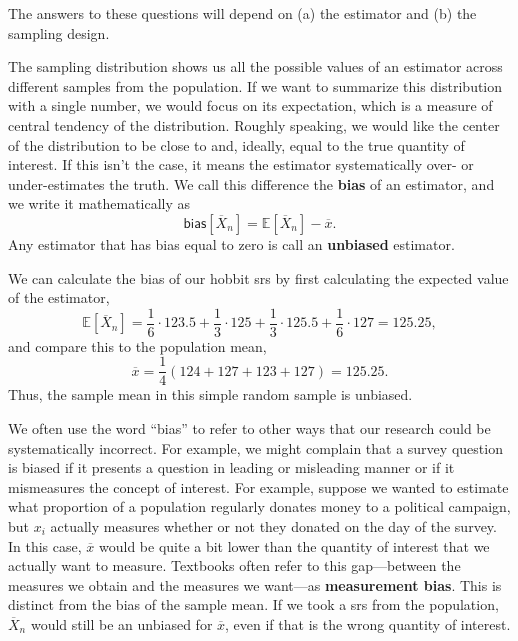 \documentclass[
  letterpaper,
  DIV=11,
  numbers=noendperiod]{scrreprt}
\newcommand{\E}{\mathbb{E}}
\newcommand{\Xbar}{\overline{X}}
\theoremstyle{definition}
\theoremstyle{definition}
\theoremstyle{plain}
\theoremstyle{remark}
\begin{document}
The answers to these questions will depend on (a) the estimator and (b)
the sampling design.

The sampling distribution shows us all the possible values of an
estimator across different samples from the population. If we want to
summarize this distribution with a single number, we would focus on its
expectation, which is a measure of central tendency of the distribution.
Roughly speaking, we would like the center of the distribution to be
close to and, ideally, equal to the true quantity of interest. If this
isn't the case, it means the estimator systematically over- or
under-estimates the truth. We call this difference the \textbf{bias} of
an estimator, and we write it mathematically as \[
\textsf{bias}[\Xbar_{n}] = \E[\Xbar_{n}] - \overline{x}.
\] Any estimator that has bias equal to zero is call an
\textbf{unbiased} estimator.

We can calculate the bias of our hobbit srs by first calculating the
expected value of the estimator, \[
\E[\Xbar_{n}] = \frac{1}{6}\cdot 123.5 + \frac{1}{3} \cdot 125 + \frac{1}{3} \cdot 125.5 + \frac{1}{6} \cdot 127 = 125.25,
\] and compare this to the population mean, \[
\overline{x} = \frac{1}{4}\left(124 + 127 + 123 + 127\right) = 125.25.
\] Thus, the sample mean in this simple random sample is unbiased.

\begin{tcolorbox}[enhanced jigsaw, colframe=quarto-callout-warning-color-frame, rightrule=.15mm, colback=white, breakable, opacityback=0, coltitle=black, opacitybacktitle=0.6, arc=.35mm, left=2mm, leftrule=.75mm, toptitle=1mm, colbacktitle=quarto-callout-warning-color!10!white, titlerule=0mm, title=\textcolor{quarto-callout-warning-color}{\faExclamationTriangle}\hspace{0.5em}{Warning}, bottomrule=.15mm, bottomtitle=1mm, toprule=.15mm]

We often use the word ``bias'' to refer to other ways that our research
could be systematically incorrect. For example, we might complain that a
survey question is biased if it presents a question in leading or
misleading manner or if it mismeasures the concept of interest. For
example, suppose we wanted to estimate what proportion of a population
regularly donates money to a political campaign, but \(x_i\) actually
measures whether or not they donated on the day of the survey. In this
case, \(\overline{x}\) would be quite a bit lower than the quantity of
interest that we actually want to measure. Textbooks often refer to this
gap---between the measures we obtain and the measures we want---as
\textbf{measurement bias}. This is distinct from the bias of the sample
mean. If we took a srs from the population, \(\Xbar_{n}\) would still be
an unbiased for \(\overline{x}\), even if that is the wrong quantity of
interest.

\end{tcolorbox}
\end{document}
